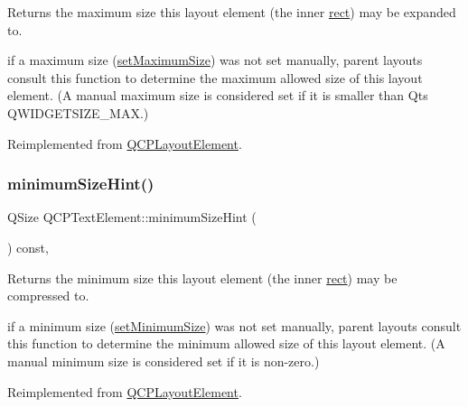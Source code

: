 Returns the maximum size this layout element (the inner \hyperlink{class_q_c_p_layout_element_a208effccfe2cca4a0eaf9393e60f2dd4}{rect}) may be expanded to.

if a maximum size (\hyperlink{class_q_c_p_layout_element_a74eb5280a737ab44833d506db65efd95}{set\+Maximum\+Size}) was not set manually, parent layouts consult this function to determine the maximum allowed size of this layout element. (A manual maximum size is considered set if it is smaller than Qt\textquotesingle{}s Q\+W\+I\+D\+G\+E\+T\+S\+I\+Z\+E\+\_\+\+M\+AX.) 

Reimplemented from \hyperlink{class_q_c_p_layout_element_ab5ce2ba22b36d9a3b70a1be562c326e5}{Q\+C\+P\+Layout\+Element}.

\mbox{\label{class_q_c_p_text_element_a5b6e94c79d0cd56c13cbedbb7021ea08}} 
\subsubsection{\texorpdfstring{minimum\+Size\+Hint()}{minimumSizeHint()}\hspace{0.1cm}{\footnotesize\ttfamily [1/2]}}
{\footnotesize\ttfamily Q\+Size Q\+C\+P\+Text\+Element\+::minimum\+Size\+Hint (\begin{DoxyParamCaption}{ }\end{DoxyParamCaption}) const\hspace{0.3cm}{\ttfamily [protected]}, {\ttfamily [virtual]}}

Returns the minimum size this layout element (the inner \hyperlink{class_q_c_p_layout_element_a208effccfe2cca4a0eaf9393e60f2dd4}{rect}) may be compressed to.

if a minimum size (\hyperlink{class_q_c_p_layout_element_a5dd29a3c8bc88440c97c06b67be7886b}{set\+Minimum\+Size}) was not set manually, parent layouts consult this function to determine the minimum allowed size of this layout element. (A manual minimum size is considered set if it is non-\/zero.) 

Reimplemented from \hyperlink{class_q_c_p_layout_element_ab3fdb5c9a5189bb2dac10d4d25329cd8}{Q\+C\+P\+Layout\+Element}.

\mbox{\label{class_q_c_p_text_element_a28c1113007c8990bf2c1a235b24381ef}} 
